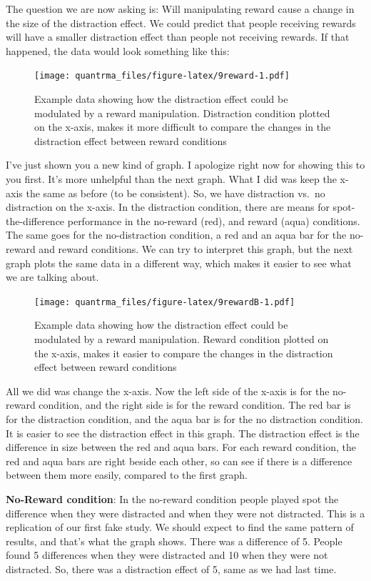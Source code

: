 \documentclass[
]{book}
\begin{document}
The question we are now asking is: Will manipulating reward cause a change in the size of the distraction effect. We could predict that people receiving rewards will have a smaller distraction effect than people not receiving rewards. If that happened, the data would look something like this:

\begin{figure}
\centering
\texttt{[image: quantrma\_files/figure-latex/9reward-1.pdf]}
\caption{\label{fig:9reward}Example data showing how the distraction effect could be modulated by a reward manipulation. Distraction condition plotted on the x-axis, makes it more difficult to compare the changes in the distraction effect between reward conditions}
\end{figure}

I've just shown you a new kind of graph. I apologize right now for showing this to you first. It's more unhelpful than the next graph. What I did was keep the x-axis the same as before (to be consistent). So, we have distraction vs.~no distraction on the x-axis. In the distraction condition, there are means for spot-the-difference performance in the no-reward (red), and reward (aqua) conditions. The same goes for the no-distraction condition, a red and an aqua bar for the no-reward and reward conditions. We can try to interpret this graph, but the next graph plots the same data in a different way, which makes it easier to see what we are talking about.

\begin{figure}
\centering
\texttt{[image: quantrma\_files/figure-latex/9rewardB-1.pdf]}
\caption{\label{fig:9rewardB}Example data showing how the distraction effect could be modulated by a reward manipulation. Reward condition plotted on the x-axis, makes it easier to compare the changes in the distraction effect between reward conditions}
\end{figure}

All we did was change the x-axis. Now the left side of the x-axis is for the no-reward condition, and the right side is for the reward condition. The red bar is for the distraction condition, and the aqua bar is for the no distraction condition. It is easier to see the distraction effect in this graph. The distraction effect is the difference in size between the red and aqua bars. For each reward condition, the red and aqua bars are right beside each other, so can see if there is a difference between them more easily, compared to the first graph.

\textbf{No-Reward condition}: In the no-reward condition people played spot the difference when they were distracted and when they were not distracted. This is a replication of our first fake study. We should expect to find the same pattern of results, and that's what the graph shows. There was a difference of 5. People found 5 differences when they were distracted and 10 when they were not distracted. So, there was a distraction effect of 5, same as we had last time.
\end{document}
